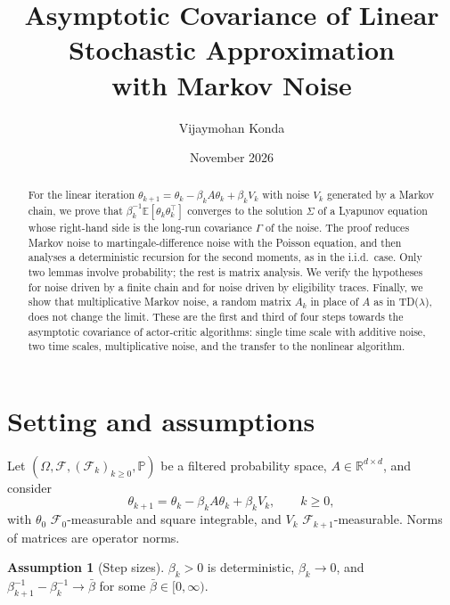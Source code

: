 \documentclass[11pt]{article}
\title{Asymptotic Covariance of Linear Stochastic Approximation\\ with Markov Noise}
\author{Vijaymohan Konda}
\date{November 2026}
\theoremstyle{definition}
\newtheorem{assumption}[theorem]{Assumption}
\theoremstyle{remark}
\newcommand{\R}{\mathbb{R}}
\newcommand{\E}{\mathbb{E}}
\newcommand{\F}{\mathcal{F}}
\begin{document}
\maketitle

\begin{abstract}
For the linear iteration $\theta_{k+1} = \theta_k - \beta_kA\theta_k + \beta_kV_k$ with
noise $V_k$ generated by a Markov chain, we prove that
$\beta_k^{-1}\E[\theta_k\theta_k^\top]$ converges to the solution $\Sigma$ of a Lyapunov
equation whose right-hand side is the long-run covariance $\Gamma$ of the noise. The
proof reduces Markov noise to martingale-difference noise with the Poisson equation,
and then analyses a deterministic recursion for the second moments, as in the
i.i.d.\ case. Only two lemmas involve probability; the rest is matrix analysis. We
verify the hypotheses for noise driven by a finite chain and for noise driven by
eligibility traces. Finally, we show that multiplicative Markov noise, a random matrix
$A_k$ in place of $A$ as in TD($\lambda$), does not change the limit. These are the first and
third of four steps towards the asymptotic covariance of actor-critic algorithms: single time
scale with additive noise, two time scales, multiplicative noise, and the transfer to the
nonlinear algorithm.
\end{abstract}

\tableofcontents

\section{Setting and assumptions}

Let $(\Omega, \F, (\F_k)_{k\ge0}, \mathbb P)$ be a filtered probability space,
$A \in \R^{d\times d}$, and consider
\begin{equation}\label{eq:iter}
  \theta_{k+1} = \theta_k - \beta_kA\theta_k + \beta_kV_k, \qquad k \ge 0,
\end{equation}
with $\theta_0$ $\F_0$-measurable and square integrable, and $V_k$
$\F_{k+1}$-measurable. Norms of matrices are operator norms.

\begin{assumption}[Step sizes]\label{ass:step}
$\beta_k > 0$ is deterministic, $\beta_k \to 0$, and
$\beta_{k+1}^{-1} - \beta_k^{-1} \to \bar\beta$ for some $\bar\beta \in [0,\infty)$.
\end{assumption}
\end{document}
